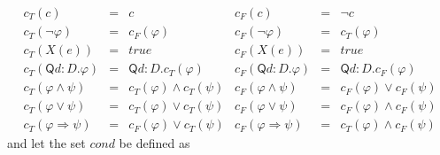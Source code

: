 \begin{equation*}
\begin{array}{llllll}
c_{T}(c) & = & c &
	c_{F}(c) & = & \lnot c \\
c_{T}(\lnot \varphi) & = & c_{F}(\varphi) &
	c_{F}(\lnot \varphi) & = & c_{T}(\varphi) \\
c_{T}(X(e)) & = & true &
	c_{F}(X(e)) & = & true \\
c_{T}(\mathsf{Q}d:{D}.\varphi) & = & \mathsf{Q}d:{D}.c_{T}(\varphi) &
	c_{F}(\mathsf{Q}d:{D}.\varphi) & = & \mathsf{Q}d:{D}.c_{F}(\varphi) \\
c_{T}(\varphi \land \psi) & = & c_{T}(\varphi) \land c_{T}(\psi) &
	c_{F}(\varphi \land \psi) & = & c_{F}(\varphi) \lor c_{F}(\psi) \\
c_{T}(\varphi \lor \psi) & = & c_{T}(\varphi) \lor c_{T}(\psi) &
	c_{F}(\varphi \lor \psi) & = & c_{F}(\varphi) \land c_{F}(\psi) \\
c_{T}(\varphi \Rightarrow \psi) & = & c_{F}(\varphi) \lor c_{T}(\psi) &
	c_{F}(\varphi \Rightarrow \psi) & = & c_{T}(\varphi) \land c_{F}(\psi)%
\end{array}%
\end{equation*}%
and let the set $cond$ be defined as%
